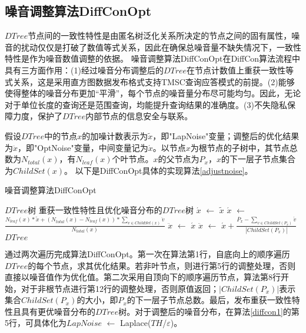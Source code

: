 

\subsection{噪音调整算法DiffConOpt}

$DTree$节点间的一致性特性是由匿名树泛化关系所决定的节点之间的固有属性，噪音的扰动仅仅是打破了数值等式关系，因此在确保总噪音量不缺失情况下，一致性特性是作为噪音数值调整的依据。
噪音调整算法DiffConOpt在DiffCon算法流程中具有三方面作用：(1)经过噪音分布调整后的$DTree$在节点计数值上重获一致性等式关系，这是采用直方图数据发布格式支持TMSC查询应答模式的前提。(2)能够使得整体的噪音分布更加“平滑”，每个节点的噪音量分布尽可能均匀。因此，无论对于单位长度的查询还是范围查询，均能提升查询结果的准确度。(3)不失隐私保障力度，保护了$DTree$内部节点的信息安全与联系。

假设$DTree$中的节点$x$的加噪计数表示为$\tilde{x}$，即"LapNoise"变量；调整后的优化结果为$\ddot{x}$，即"OptNoise"变量，中间变量记为$\acute{x}$。以节点$x$为根节点的子树中，其节点总数为$N_{total}(x)$，有$N_{leaf}(x)$个叶节点。$x$的父节点为$P_{x}$，$x$的下一层子节点集合为$ChildSet(x)$。
以下是DiffConOpt具体的实现算法\ref{adjustnoise}。

\begin{algorithm}[H]
	\caption{噪音调整算法DiffConOpt} 
	\label{adjustnoise}
	\begin{algorithmic}[1]
		\REQUIRE $DTree$树
		\ENSURE 重获一致性特性且优化噪音分布的$DTree$树
		\STATE $\acute{x}$ $\leftarrow$ $\tilde{x}$ 
		\ELSE
		\STATE  $\acute{x}$ $\leftarrow$ $\frac{{N_{leaf}(x) * \tilde{x} + (N_{total}(x) - N_{leaf}(x)) * \sum\nolimits_{v \in ChildSet(x)} {\ddot{v}}}}{{N_{total}(x)}}$
		\ENDIF
		\ENDFOR
		\STATE  $\ddot{x}$ $\leftarrow$ $\acute{x}$
		\ELSE
		\STATE  $\ddot{x}$ $\leftarrow$ $\acute{x} + \frac{{\ddot{P_{x}} - \sum\nolimits_{v \in ChildSet(P_{x})} {\acute{v}}}}{|ChildSet(P_{x})|}$
		\ENDIF
		\ENDFOR
		\RETURN $DTree$
	\end{algorithmic}
\end{algorithm}

通过两次遍历完成算法DiffConOpt。第一次在算法第1行，自底向上的顺序遍历$DTree$的每个节点，求其优化结果。若非叶节点，则进行第5行的调整处理，否则直接以噪音值作为优化值。第二次采用自顶向下的顺序遍历节点，算法第8行开始，对于非根节点进行第12行的调整处理，否则原值返回；$|ChildSet(P_{x})|$表示集合$ChildSet(P_{x})$的大小，即$P_{x}$的下一层子节点总数。最后，发布重获一致性特性且具有更优噪音分布的$DTree$树。对于调整后的噪音分布，在算法\ref{diffcon1}的第5行，可具体化为$LapNoise$ $\leftarrow$ Laplace($TH$/$\varepsilon$)。

